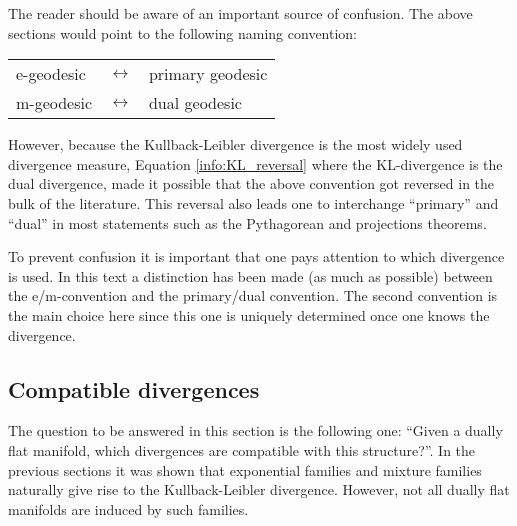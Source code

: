     \begin{remark}
        The reader should be aware of an important source of confusion. The above sections would point to the following naming convention:
        \begin{center}
            \begin{tabular}{lll}
                e-geodesic&$\leftrightarrow$&primary geodesic\\
                m-geodesic&$\leftrightarrow$&dual geodesic
            \end{tabular}
        \end{center}
        However, because the Kullback-Leibler divergence is the most widely used divergence measure, Equation \eqref{info:KL_reversal} where the KL-divergence is the dual divergence, made it possible that the above convention got reversed in the bulk of the literature. This reversal also leads one to interchange ``primary'' and ``dual'' in most statements such as the Pythagorean and projections theorems.

        To prevent confusion it is important that one pays attention to which divergence is used. In this text a distinction has been made (as much as possible) between the e/m-convention and the primary/dual convention. The second convention is the main choice here since this one is uniquely determined once one knows the divergence.
    \end{remark}

\subsection{Compatible divergences}

    The question to be answered in this section is the following one: ``Given a dually flat manifold, which divergences are compatible with this structure?''. In the previous sections it was shown that exponential families and mixture families naturally give rise to the Kullback-Leibler divergence. However, not all dually flat manifolds are induced by such families.

